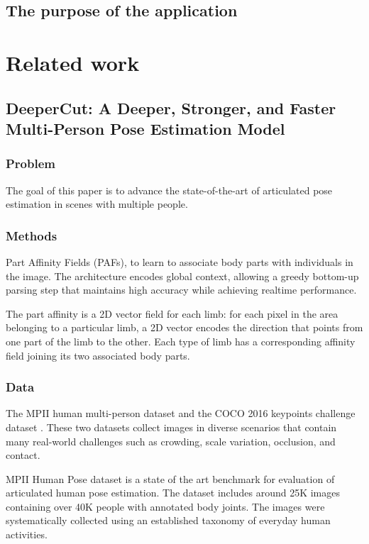 \documentclass[runningheads,a4paper,11pt]{report}
\begin{document}
\section{The purpose of the application}
\chapter{Related work}

\section{DeeperCut\mbox{:} A Deeper, Stronger, and Faster Multi-Person Pose Estimation Model \cite{DBLP:journals/corr/InsafutdinovPAA16}}

\subsection{Problem}
The goal of this paper is to advance the state-of-the-art of articulated pose estimation in scenes with multiple people.

\subsection{Methods}
\par Part Affinity Fields (PAFs), to learn to associate body parts with individuals in the image. The architecture encodes global context, allowing a greedy bottom-up parsing step that maintains high accuracy while achieving realtime performance.	
\par The part affinity is a 2D vector field for each limb: for each pixel in the area belonging to a particular limb, a 2D vector encodes the direction that points from one part of the limb to the other. Each type of limb has a corresponding affinity field joining its two associated body parts.


\subsection{Data}
\par The MPII human multi-person dataset \cite{database2dhuman}  and the COCO 2016 keypoints challenge dataset \cite{coco2016}. These two datasets collect images in diverse scenarios that contain many real-world challenges such as crowding, scale variation, occlusion, and contact.
\par MPII Human Pose dataset is a state of the art benchmark for evaluation of articulated human pose estimation. The dataset includes around 25K images containing over 40K people with annotated body joints. The images were systematically collected using an established taxonomy of everyday human activities.
\end{document}

